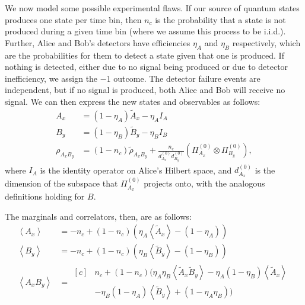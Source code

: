 \documentclass[10pt, a4paper]{article}
\numberwithin{equation}{section} %
\theoremstyle{definition}
\theoremstyle{plain}
\newcommand{\?}{\mathrel{?}} %
\newcommand{\angleb}[1]{\left\langle #1 \right\rangle} %
\begin{document}
    We now model some possible experimental flaws. If our source of quantum states produces one state per time bin, then \(n_c\) is the probability that a state is not produced during a given time bin (where we assume this process to be i.i.d.). Further, Alice and Bob's detectors have efficiencies \(\eta_A\) and \(\eta_B\) respectively, which are the probabilities for them to detect a state given that one is produced. If nothing is detected, either due to no signal being produced or due to detector inefficiency, we assign the \(-1\) outcome. The detector failure events are independent, but if no signal is produced, both Alice and Bob will receive no signal. We can then express the new states and observables as follows:
    \begin{align*}
      A_x &= (1-\eta_A)\tilde{A}_x - \eta_A I_A \\
      B_y &= (1-\eta_B)\tilde{B}_y - \eta_B I_B \\
      \rho_{{A_x}{B_y}} &= (1-n_c)\tilde{\rho}_{{A_x}{B_y}} + \frac{n_c}{d^{(0)}_{A_x} d^{(0)}_{B_y}} \left( \Pi_{A_x}^{(0)} \otimes \Pi_{B_y}^{(0)} \right),
    \end{align*}
    where \(I_A\) is the identity operator on Alice's Hilbert space, and \(d^{(0)}_{A_x}\) is the dimension of the subspace that \(\Pi_{A_x}^{(0)}\) projects onto, with the analogous definitions holding for \(B\).

    The marginals and correlators, then, are as follows:
    \begin{align*}
      \angleb{A_x} &= -n_c + (1-n_c)(\eta_A\angleb{\tilde{A}_x} - (1-\eta_A)) \\
      \angleb{B_y} &= -n_c + (1-n_c)(\eta_B\angleb{\tilde{B}_y} - (1-\eta_B)) \\
      \angleb{A_x B_y} &= \begin{aligned}[c]
      & n_c + (1-n_c)(\eta_A\eta_B\angleb{\tilde{A}_x\tilde{B}_y} - \eta_A(1-\eta_B)\angleb{\tilde{A}_x} \\
      & -\eta_B(1-\eta_A)\angleb{\tilde{B}_y} + (1-\eta_A\eta_B) )
      \end{aligned}
      \end{align*}
\end{document}

